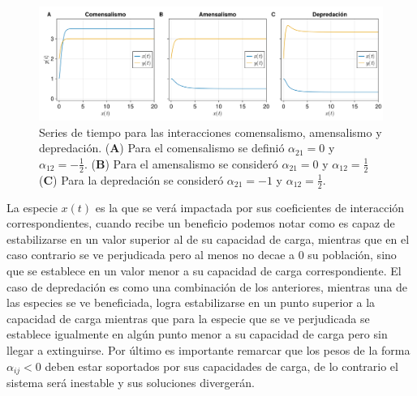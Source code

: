 \begin{ejemplo}
 	\begin{figure}[h!]
 		\centering
 		\includegraphics[scale=0.2]{../Imagenes/STrestoInteracciones}
 		\caption{Series de tiempo para las interacciones comensalismo, amensalismo y depredación. (\textbf{A}) Para el comensalismo se definió $\alpha_{21}=0$ y $\alpha_{12}=-\frac{1}{2}$. (\textbf{B}) Para el amensalismo se consideró $\alpha_{21}=0$ y $\alpha_{12}=\frac{1}{2}$ (\textbf{C}) Para la depredación se consideró $\alpha_{21}=-1$ y $\alpha_{12}=\frac{1}{2}$.}
 		\label{fig:RestoInteraccionesST}
 	\end{figure}
	La especie $x(t)$ es la que se verá impactada por sus coeficientes de interacción correspondientes, cuando recibe un beneficio podemos notar como es capaz de estabilizarse en un valor superior al de su capacidad de carga, mientras que en el caso contrario se ve perjudicada pero al menos no decae a $0$ su población, sino que se establece en un valor menor a su capacidad de carga correspondiente. El caso de depredación es como una combinación de los anteriores, mientras una de las especies se ve beneficiada, logra estabilizarse en un punto superior a la capacidad de carga mientras que para la especie que se ve perjudicada se establece igualmente en algún punto menor a su capacidad de carga pero sin llegar a extinguirse. Por último es importante remarcar que los pesos de la forma $\alpha_{ij}<0$ deben estar soportados por sus capacidades de carga, de lo contrario el sistema será inestable y sus soluciones divergerán.
\end{ejemplo}

